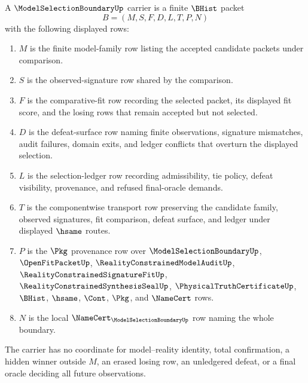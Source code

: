 \begin{definition}
\label{def:model-selection-boundary-carrier}
A $\ModelSelectionBoundaryUp$ carrier is a finite $\BHist$ packet
$$
B=(M,S,F,D,L,T,P,N)
$$
with the following displayed rows:
\begin{enumerate}
\item $M$ is the finite model-family row listing the accepted candidate packets under comparison.
\item $S$ is the observed-signature row shared by the comparison.
\item $F$ is the comparative-fit row recording the selected packet, its displayed fit score, and the losing rows that remain accepted but not selected.
\item $D$ is the defeat-surface row naming finite observations, signature mismatches, audit failures, domain exits, and ledger conflicts that overturn the displayed selection.
\item $L$ is the selection-ledger row recording admissibility, tie policy, defeat visibility, provenance, and refused final-oracle demands.
\item $T$ is the componentwise transport row preserving the candidate family, observed signatures, fit comparison, defeat surface, and ledger under displayed $\hsame$ routes.
\item $P$ is the $\Pkg$ provenance row over $\ModelSelectionBoundaryUp$, $\OpenFitPacketUp$, $\RealityConstrainedModelAuditUp$, $\RealityConstrainedSignatureFitUp$, $\RealityConstrainedSynthesisSealUp$, $\PhysicalTruthCertificateUp$, $\BHist$, $\hsame$, $\Cont$, $\Pkg$, and $\NameCert$ rows.
\item $N$ is the local $\NameCert_{\ModelSelectionBoundaryUp}$ row naming the whole boundary.
\end{enumerate}
The carrier has no coordinate for model--reality identity, total confirmation, a hidden winner outside $M$, an erased losing row, an unledgered defeat, or a final oracle deciding all future observations.
\end{definition}

